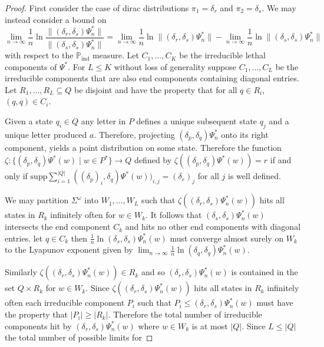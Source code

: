 \documentclass[a4paper,UKenglish,cleveref, autoref,mathscr]{lipics-v2019}
\newcommand{\PP}{\mathbb{P}}
\newcommand{\1}{\mathbbm{1}}
\newcommand{\supp}{\mathrm{supp}}
\begin{document}
\begin{proof}
First consider the case of dirac distributions $\pi_1 = \delta_r$ and $\pi_2 = \delta_s$. We may instead consider a bound on
\begin{equation*}
\lim_{n \rightarrow \infty} \frac{1}{n} \ln \frac{\| (\delta_r, \delta_s) \Psi_n^* \|}{\| (\delta_s, \delta_s) \Psi_n^* \|} = \lim_{n \rightarrow \infty} \frac1n \ln \| (\delta_r, \delta_s) \Psi_n^*\| - \lim_{n \rightarrow \infty} \frac1n \ln \| (\delta_s, \delta_s) \Psi_n^*\|
\end{equation*}
with respect to the $\PP_\text{ind}$ measure. Let $C_1, \dots, C_K$ be the irreducible lethal components of $\Psi^*$. For $L \leq K$ without loss of generality suppose $C_1, \dots, C_L$ be the irreducible components that are also end components containing diagonal entries. Let $R_1, \dots, R_L \subseteq Q$ be disjoint and have the property that for all $q \in R_i$, $(q, q) \in C_i$. 

Given a state $q_i \in Q$ any letter in $P$ defines a unique subsequent state $q_j$ and a unique letter produced $a$. Therefore, projecting $(\delta_p, \delta_q) \Psi^*_n$ onto its right component, yields a point distribution on some state. Therefore the function $\zeta : \{(\delta_p, \delta_q) \Psi^*(w) \mid w \in P^*\} \rightarrow Q$ defined by $\zeta((\delta_p, \delta_q) \Psi^*(w)) = r$ if and only if $\supp \sum_{i = 1}^{|Q|} ((\delta_p)_i, \delta_q) \Psi^*(w))_{i,j} = (\delta_r)_j$ for all $j$ is well defined.

We may partition $\Sigma^\omega$ into $W_1, \dots, W_L$ such that $\zeta((\delta_r, \delta_s) \Psi^*_n(w))$ hits all states in $R_k$ infinitely often for $w \in W_k$. It follows that $(\delta_s, \delta_s) \Psi^*_n(w)$ intersects the end component $C_k$ and hits no other end components with diagonal entries. let $q \in C_k$ then $\frac1n \ln(\delta_s, \delta_s) \Psi^*_n(w)$ must converge almost surely on $W_k$ to the Lyapunov exponent given by $\lim_{n \rightarrow \infty} \frac1n \ln(\delta_q, \delta_q) \Psi^*_n(w)$.

Similarly $\zeta((\delta_r, \delta_s) \Psi^*_n(w)) \in R_k$ and so $(\delta_r, \delta_s) \Psi^*_n(w)$ is contained in the set $Q \times R_k$ for $w \in W_k$. Since $\zeta((\delta_r, \delta_s) \Psi^*_n(w))$ hits all states in $R_k$ infinitely often each irreducible component $P_i$ such that $P_i \leq (\delta_r, \delta_s) \Psi^*_n(w)$ must have the property that $|P_i| \geq |R_k|$. Therefore the total number of irreducible components hit by $(\delta_r, \delta_s) \Psi^*_n(w)$ where $w \in W_k$ is at most $|Q|$. Since $L \leq |Q|$ the total number of possible limits for 


\end{proof}
\end{document}
